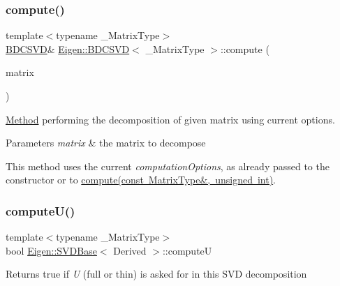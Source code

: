\subsubsection{\texorpdfstring{compute()}{compute()}\hspace{0.1cm}{\footnotesize\ttfamily [2/2]}}
{\footnotesize\ttfamily template$<$typename \+\_\+\+Matrix\+Type$>$ \\
\mbox{\hyperlink{class_eigen_1_1_b_d_c_s_v_d}{B\+D\+C\+S\+VD}}\& \mbox{\hyperlink{class_eigen_1_1_b_d_c_s_v_d}{Eigen\+::\+B\+D\+C\+S\+VD}}$<$ \+\_\+\+Matrix\+Type $>$\+::compute (\begin{DoxyParamCaption}\item[{const Matrix\+Type \&}]{matrix }\end{DoxyParamCaption})\hspace{0.3cm}{\ttfamily [inline]}}



\mbox{\hyperlink{struct_method}{Method}} performing the decomposition of given matrix using current options. 


\begin{DoxyParams}{Parameters}
{\em matrix} & the matrix to decompose\\
\hline
\end{DoxyParams}
This method uses the current {\itshape computation\+Options}, as already passed to the constructor or to \mbox{\hyperlink{class_eigen_1_1_b_d_c_s_v_d_a52e3c627775010775c64d16a00cdb770}{compute(const Matrix\+Type\&, unsigned int)}}. \mbox{\label{class_eigen_1_1_b_d_c_s_v_d_a705a7c2709e1624ccc19aa748a78d473}} 
\subsubsection{\texorpdfstring{computeU()}{computeU()}}
{\footnotesize\ttfamily template$<$typename \+\_\+\+Matrix\+Type$>$ \\
bool \mbox{\hyperlink{class_eigen_1_1_s_v_d_base}{Eigen\+::\+S\+V\+D\+Base}}$<$ Derived $>$\+::computeU\hspace{0.3cm}{\ttfamily [inline]}}

\begin{DoxyReturn}{Returns}
true if {\itshape U} (full or thin) is asked for in this S\+VD decomposition 
\end{DoxyReturn}
\mbox{\label{class_eigen_1_1_b_d_c_s_v_d_a5f12efcb791eb007d4a4890ac5255ac4}} 
